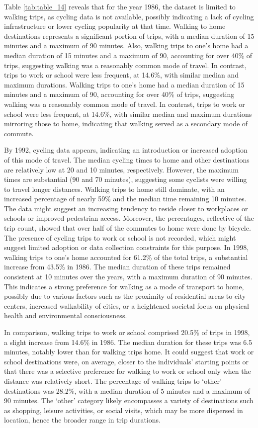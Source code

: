 \documentclass[12pt,twoside]{reedthesis}
\begin{document}
Table \ref{tab:table_14} reveals that for the year 1986, the dataset is limited to walking trips, as cycling data is not available, possibly indicating a lack of cycling infrastructure or lower cycling popularity at that time. Walking to home destinations represents a significant portion of trips, with a median duration of 15 minutes and a maximum of 90 minutes. Also, walking trips to one's home had a median duration of 15 minutes and a maximum of 90, accounting for over 40\% of trips, suggesting walking was a reasonably common mode of travel. In contrast, trips to work or school were less frequent, at 14.6\%, with similar median and maximum durations. Walking trips to one's home had a median duration of 15 minutes and a maximum of 90, accounting for over 40\% of trips, suggesting walking was a reasonably common mode of travel. In contrast, trips to work or school were less frequent, at 14.6\%, with similar median and maximum durations mirroring those to home, indicating that walking served as a secondary mode of commute.

By 1992, cycling data appears, indicating an introduction or increased adoption of this mode of travel. The median cycling times to home and other destinations are relatively low at 20 and 10 minutes, respectively. However, the maximum times are substantial (90 and 70 minutes), suggesting some cyclists were willing to travel longer distances. Walking trips to home still dominate, with an increased percentage of nearly 59\% and the median time remaining 10 minutes. The data might suggest an increasing tendency to reside closer to workplaces or schools or improved pedestrian access. Moreover, the percentages, reflective of the trip count, showed that over half of the commutes to home were done by bicycle. The presence of cycling trips to work or school is not recorded, which might suggest limited adoption or data collection constraints for this purpose. In 1998, walking trips to one's home accounted for 61.2\% of the total trips, a substantial increase from 43.5\% in 1986. The median duration of these trips remained consistent at 10 minutes over the years, with a maximum duration of 90 minutes. This indicates a strong preference for walking as a mode of transport to home, possibly due to various factors such as the proximity of residential areas to city centers, increased walkability of cities, or a heightened societal focus on physical health and environmental consciousness.

In comparison, walking trips to work or school comprised 20.5\% of trips in 1998, a slight increase from 14.6\% in 1986. The median duration for these trips was 6.5 minutes, notably lower than for walking trips home. It could suggest that work or school destinations were, on average, closer to the individuals' starting points or that there was a selective preference for walking to work or school only when the distance was relatively short. The percentage of walking trips to `other' destinations was 28.2\%, with a median duration of 5 minutes and a maximum of 90 minutes. The `other' category likely encompasses a variety of destinations such as shopping, leisure activities, or social visits, which may be more dispersed in location, hence the broader range in trip durations.
\end{document}
